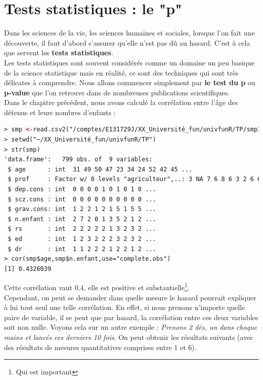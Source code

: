 \section{Tests statistiques : le "p" }
Dans les sciences de la vie, les sciences humaines et sociales, lorsque l'on fait une découverte, il faut d'abord s'assurer qu'elle n'est pas dû au hasard. \newline
C'est à cela que servent les \textbf{tests statistiques}.\newline
\\
Les tests statistiques sont souvent considérés comme un domaine un peu basique de la science statistique mais en réalité, ce sont des techniques qui sont très délicates à comprendre.\newline
Nous allons commencer simplement par \textbf{le test du p} ou \textbf{p-value} que l'on retrouve dans de nombreuses publications scientifiques.\newline
\\
Dans le chapitre précédent, nous avons calculé la corrélation entre l'âge des détenus et leurs nombres d'enfants : 
\begin{lstlisting}[language=html]
> smp <-read.csv2("/comptes/E131729J/XX_Université_fun/univfunR/TP/smp1.csv")
> setwd("~/XX_Université_fun/univfunR/TP")
> str(smp)
'data.frame':	799 obs. of  9 variables:
 $ age      : int  31 49 50 47 23 34 24 52 42 45 ...
 $ prof     : Factor w/ 8 levels "agriculteur",..: 3 NA 7 6 8 6 3 2 6 6 ...
 $ dep.cons : int  0 0 0 0 1 0 1 0 1 0 ...
 $ scz.cons : int  0 0 0 0 0 0 0 0 0 0 ...
 $ grav.cons: int  1 2 2 1 2 1 5 1 5 5 ...
 $ n.enfant : int  2 7 2 0 1 3 5 2 1 2 ...
 $ rs       : int  2 2 2 2 2 1 3 2 3 2 ...
 $ ed       : int  1 2 3 2 2 2 3 2 3 2 ...
 $ dr       : int  1 1 2 2 2 1 2 2 1 2 ...
> cor(smp$age,smp$n.enfant,use="complete.obs")
[1] 0.4326039
\end{lstlisting}
Cette corrélation vaut $0.4$, elle est positive et substantielle\footnote{Qui est important}.\newline
\\
Cependant, on peut se demander dans quelle mesure le hasard pourrait expliquer à lui tout seul une telle corrélation. En effet, si nous prenons n'importe quelle paire de variable, il se peut que par hasard, la corrélation entre ces deux variables soit non nulle.\newline
Voyons cela sur un autre exemple : \textit{Prenons 2 dés, un dans chaque mains et lancés ces derniers 10 fois}. On peut obtenir les résultats suivants (avec des résultats de mesures quantitatives comprises entre 1 et 6).
